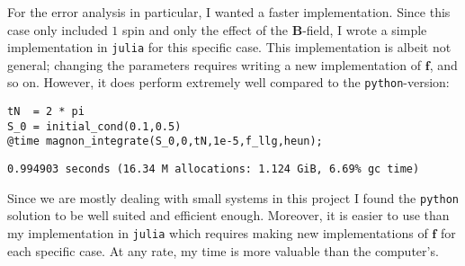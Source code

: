 For the error analysis in particular, I wanted a faster implementation. Since this case only included $1$ spin and only the effect of the $\mathbf{B}$-field, I wrote a simple implementation in \texttt{julia} for this specific case. This implementation is albeit not general; changing the parameters requires writing a new implementation of $\mathbf{f}$, and so on. However, it does perform extremely well compared to the \texttt{python}-version:

\begin{lstlisting}
tN  = 2 * pi
S_0 = initial_cond(0.1,0.5)
@time magnon_integrate(S_0,0,tN,1e-5,f_llg,heun);
\end{lstlisting}
\texttt{\small 0.994903 seconds (16.34 M allocations: 1.124 GiB, 6.69\% gc time)}

Since we are mostly dealing with small systems in this project I found the \texttt{python} solution to be well suited and efficient enough. Moreover, it is easier to use than my implementation in \texttt{julia} which requires making new implementations of $\mathbf{f}$ for each specific case. At any rate, my time is more valuable than the computer's. 